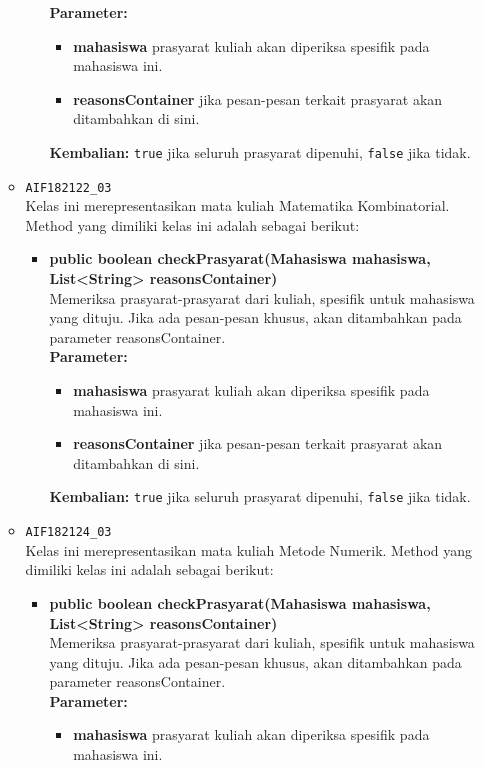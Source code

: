 \begin{enumerate}
\begin{itemize}
\begin{itemize}
			\textbf{Parameter:}
			\begin{itemize}
				\item \textbf{mahasiswa} prasyarat kuliah akan diperiksa spesifik pada mahasiswa ini.
				\item \textbf{reasonsContainer} jika pesan-pesan terkait prasyarat akan ditambahkan di sini.
			\end{itemize}
			\textbf{Kembalian:} \texttt{true} jika seluruh prasyarat dipenuhi, \texttt{false} jika tidak.
		\end{itemize}
		\item \texttt{AIF182122\_03} \\
		Kelas ini merepresentasikan mata kuliah Matematika Kombinatorial. Method yang dimiliki kelas ini adalah sebagai berikut: 
		\begin{itemize}
			\item \textbf{public boolean checkPrasyarat(Mahasiswa mahasiswa, List<String> reasonsContainer)}\\
			Memeriksa prasyarat-prasyarat dari kuliah, spesifik untuk mahasiswa yang dituju. Jika ada pesan-pesan khusus, akan ditambahkan pada parameter reasonsContainer.\\
			\textbf{Parameter:}
			\begin{itemize}
				\item \textbf{mahasiswa} prasyarat kuliah akan diperiksa spesifik pada mahasiswa ini.
				\item \textbf{reasonsContainer} jika pesan-pesan terkait prasyarat akan ditambahkan di sini.
			\end{itemize}
			\textbf{Kembalian:} \texttt{true} jika seluruh prasyarat dipenuhi, \texttt{false} jika tidak.
		\end{itemize}
		\item \texttt{AIF182124\_03} \\
		Kelas ini merepresentasikan mata kuliah Metode Numerik. Method yang dimiliki kelas ini adalah sebagai berikut: 
		\begin{itemize}
			\item \textbf{public boolean checkPrasyarat(Mahasiswa mahasiswa, List<String> reasonsContainer)}\\
			Memeriksa prasyarat-prasyarat dari kuliah, spesifik untuk mahasiswa yang dituju. Jika ada pesan-pesan khusus, akan ditambahkan pada parameter reasonsContainer.\\
			\textbf{Parameter:}
			\begin{itemize}
				\item \textbf{mahasiswa} prasyarat kuliah akan diperiksa spesifik pada mahasiswa ini.

\end{itemize}
\end{itemize}
\end{itemize}
\end{enumerate}
